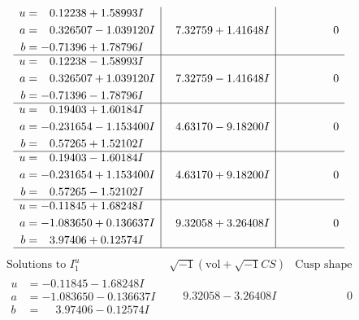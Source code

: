 \documentclass[1p]{elsarticle_modified}
\theoremstyle{definition}
\newcommand{\I}{\sqrt{-1}}
\begin{document}
$$\begin{array}{c|c|c}
\begin{aligned}
u &= \phantom{-}0.12238 + 1.58993 I \\
a &= \phantom{-}0.326507 - 1.039120 I \\
b &= -0.71396 + 1.78796 I\end{aligned}
 & \phantom{-}7.32759 + 1.41648 I & \phantom{-0.000000 } 0 \\ \hline\begin{aligned}
u &= \phantom{-}0.12238 - 1.58993 I \\
a &= \phantom{-}0.326507 + 1.039120 I \\
b &= -0.71396 - 1.78796 I\end{aligned}
 & \phantom{-}7.32759 - 1.41648 I & \phantom{-0.000000 } 0 \\ \hline\begin{aligned}
u &= \phantom{-}0.19403 + 1.60184 I \\
a &= -0.231654 - 1.153400 I \\
b &= \phantom{-}0.57265 + 1.52102 I\end{aligned}
 & \phantom{-}4.63170 - 9.18200 I & \phantom{-0.000000 } 0 \\ \hline\begin{aligned}
u &= \phantom{-}0.19403 - 1.60184 I \\
a &= -0.231654 + 1.153400 I \\
b &= \phantom{-}0.57265 - 1.52102 I\end{aligned}
 & \phantom{-}4.63170 + 9.18200 I & \phantom{-0.000000 } 0 \\ \hline\begin{aligned}
u &= -0.11845 + 1.68248 I \\
a &= -1.083650 + 0.136637 I \\
b &= \phantom{-}3.97406 + 0.12574 I\end{aligned}
 & \phantom{-}9.32058 + 3.26408 I & \phantom{-0.000000 } 0\\
 \hline 
 \end{array}$$\newpage$$\begin{array}{c|c|c}  
\text{Solutions to }I^u_{1}& \I (\text{vol} + \sqrt{-1}CS) & \text{Cusp shape}\\
 \hline 
\begin{aligned}
u &= -0.11845 - 1.68248 I \\
a &= -1.083650 - 0.136637 I \\
b &= \phantom{-}3.97406 - 0.12574 I\end{aligned}
 & \phantom{-}9.32058 - 3.26408 I & \phantom{-0.000000 } 0 \\ \hline\begin{aligned}

\end{aligned}
\end{array}$$
\end{document}
